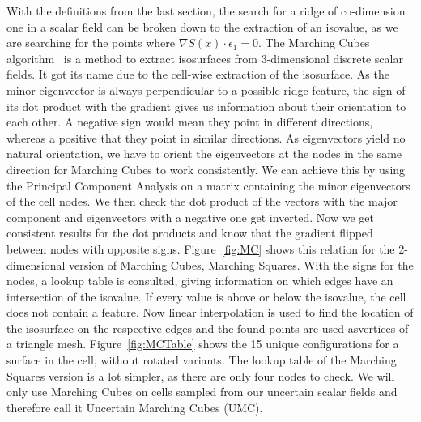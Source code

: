 With the definitions from the last section, the search for a ridge of
co-dimension one in a scalar field can be broken down to the extraction
of an isovalue, as we are searching for the points where $\nabla S(x)
\cdot \epsilon_1 = 0$. The Marching Cubes algorithm~\cite{MC} is a
method to extract isosurfaces from 3-dimensional discrete scalar fields.
It got its name due to the cell-wise extraction of the isosurface. As
the minor eigenvector is always perpendicular to a possible ridge
feature, the sign of its dot product with the gradient gives us
information about their orientation to each other. A negative sign would
mean they point in different directions, whereas a positive that they
point in similar directions. As eigenvectors yield no natural
orientation, we have to orient the eigenvectors at the nodes in the same
direction for Marching Cubes to work consistently. We can achieve this
by using the Principal Component Analysis on a matrix containing the
minor eigenvectors of the cell nodes. We then check the dot product of
the vectors with the major component and eigenvectors with a negative
one get inverted. Now we get consistent results for the dot products and
know that the gradient flipped between nodes with opposite signs.
Figure~\ref{fig:MC} shows this relation for the 2-dimensional version of
Marching Cubes, Marching Squares. With the signs for the nodes, a lookup
table is consulted, giving information on which edges have an
intersection of the isovalue. If every value is above or below the
isovalue, the cell does not contain a feature. Now linear interpolation
is used to find the location of the isosurface on the respective edges
and the found points are used asvertices of a triangle mesh.
Figure~\ref{fig:MCTable} shows the 15 unique configurations for a
surface in the cell, without rotated variants. The lookup table of the
Marching Squares version is a lot simpler, as there are only four nodes
to check. We will only use Marching Cubes on cells sampled from our
uncertain scalar fields and therefore call it Uncertain Marching Cubes
(UMC).

